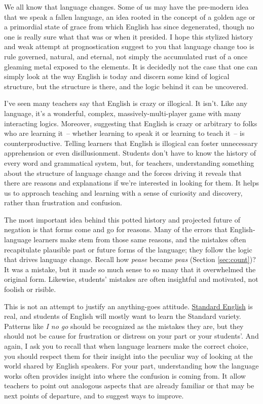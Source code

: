We all know that language changes. Some of us may have the pre-modern idea that we speak a fallen language, an idea rooted in the concept of a golden age or a primordial state of grace from which English has since degenerated, though no one is really sure what that was or when it presided. I hope this stylized history and weak attempt at prognostication suggest to you that language change too is rule governed, natural, and eternal, not simply the accumulated rust of a once gleaming metal exposed to the elements. It is decidedly not the case that one can simply look at the way English is today and discern some kind of logical structure, but the structure is there, and the logic behind it can be uncovered.

I've seen many teachers say that English is crazy or illogical. It isn't. Like any language, it's a wonderful, complex, massively-multi-player game with many interacting logics. Moreover, suggesting that English is crazy or arbitrary to folks who are learning it~-- whether learning to speak it or learning to teach it~-- is counterproductive. Telling learners that English is illogical can foster unnecessary apprehension or even disillusionment. Students don't have to know the history of every word and grammatical system, but, for teachers, understanding something about the structure of language change and the forces driving it reveals that there are reasons and explanations if we're interested in looking for them. It helps us to approach teaching and learning with a sense of curiosity and discovery, rather than frustration and confusion.

The most important idea behind this potted history and projected future of negation is that forms come and go for reasons. Many of the errors that English-language learners make stem from those same reasons, and the mistakes often recapitulate plausible past or future forms of the language; they follow the logic that drives language change. Recall how \textit{pease} became \textit{peas} (Section \ref{sec:count})? It was a mistake, but it made so much sense to so many that it overwhelmed the original form. Likewise, students' mistakes are often insightful and motivated, not foolish or risible.

This is not an attempt to justify an anything-goes attitude. \href{ch:standards}{Standard English} is real, and students of English will mostly want to learn the Standard variety. Patterns like \textit{I no go} should be recognized as the mistakes they are, but they should not be cause for frustration or distress on your part or your students'. And again, I ask you to recall that when language learners make the correct choice, you should respect them for their insight into the peculiar way of looking at the world shared by English speakers. For your part, understanding how the language works often provides insight into where the confusion is coming from. It allow teachers to point out analogous aspects that are already familiar or that may be next points of departure, and to suggest ways to improve.


